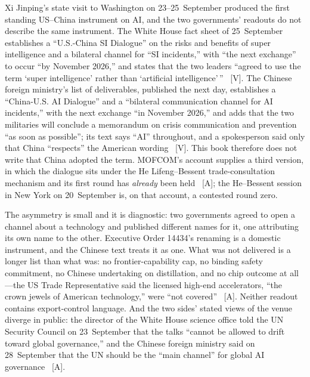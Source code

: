 Xi Jinping's state visit to Washington on 23--25~September produced the first standing US--China instrument on AI, and the two governments' readouts do not describe the same instrument. The White House fact sheet of 25~September establishes a ``U.S.-China SI Dialogue'' on the risks and benefits of super intelligence and a bilateral channel for ``SI incidents,'' with ``the next exchange'' to occur ``by November 2026,'' and states that the two leaders ``agreed to use the term `super intelligence' rather than `artificial intelligence'\,''~\cite{gov-wh-xi-factsheet} [V]. The Chinese foreign ministry's list of deliverables, published the next day, establishes a ``China-U.S. AI Dialogue'' and a ``bilateral communication channel for AI incidents,'' with the next exchange ``in November 2026,'' and adds that the two militaries will conclude a memorandum on crisis communication and prevention ``as soon as possible''; its text says ``AI'' throughout, and a spokesperson said only that China ``respects'' the American wording~\cite{gov-mfa-deliverables} [V]. This book therefore does not write that China adopted the term. MOFCOM's account supplies a third version, in which the dialogue sits under the He Lifeng--Bessent trade-consultation mechanism and its first round has \emph{already} been held~\cite{gov-summit-readings} [A]; the He--Bessent session in New York on 20~September is, on that account, a contested round zero.

The asymmetry is small and it is diagnostic: two governments agreed to open a channel about a technology and published different names for it, one attributing its own name to the other. Executive Order 14434's renaming is a domestic instrument, and the Chinese text treats it as one. What was not delivered is a longer list than what was: no frontier-capability cap, no binding safety commitment, no Chinese undertaking on distillation, and no chip outcome at all---the US Trade Representative said the licensed high-end accelerators, ``the crown jewels of American technology,'' were ``not covered''~\cite{gov-summit-readings} [A]. Neither readout contains export-control language. And the two sides' stated views of the venue diverge in public: the director of the White House science office told the UN Security Council on 23~September that the talks ``cannot be allowed to drift toward global governance,'' and the Chinese foreign ministry said on 28~September that the UN should be the ``main channel'' for global AI governance~\cite{gov-summit-readings} [A].

